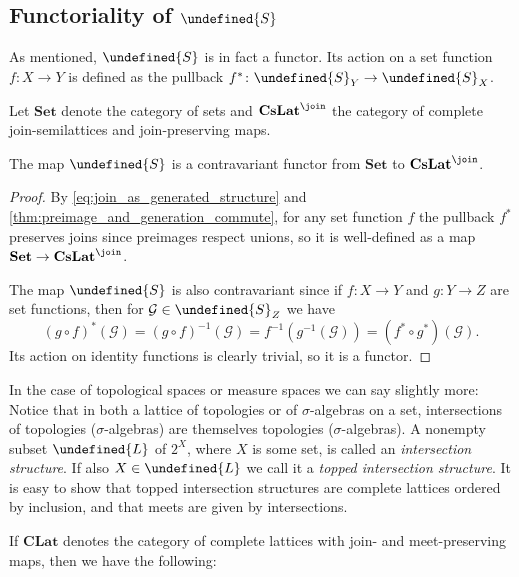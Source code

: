 \documentclass[article, a4paper, 11pt, oneside]{memoir}
\let\mathfrak\undefined
\numberwithin{equation}{chapter}
\newcommand{\calG}{\mathcal{G}}
\newcommand{\strucS}{\mathfrak{S}}
\newcommand{\frakL}{\mathfrak{L}}
\newcommand{\ncat}[1]{\mathbf{#1}} %
\newcommand{\catSet}{\ncat{Set}} %
\newcommand{\catCLat}{\ncat{CLat}} %
\newcommand{\catCJoinLat}{\ncat{CsLat}^{\join}} %
\newcommand{\preim}{^{-1}}
\begin{document}
\subsection{Functoriality of $\strucS$}

As mentioned, $\strucS$ is in fact a functor. Its action on a set function $f \colon X \to Y$ is defined as the pullback $f^* \colon \strucS_Y \to \strucS_X$. 

Let $\catSet$ denote the category of sets and $\catCJoinLat$ the category of complete join-semilattices and join-preserving maps.

\begin{proposition}[Functoriality of $\strucS$, I]
    The map $\strucS$ is a contravariant functor from $\catSet$ to $\catCJoinLat$.
\end{proposition}

\begin{proof}
    By \eqref{eq:join_as_generated_structure} and \cref{thm:preimage_and_generation_commute}, for any set function $f$ the pullback $f^*$ preserves joins since preimages respect unions, so it is well-defined as a map $\catSet \to \catCJoinLat$.
    
    The map $\strucS$ is also contravariant since if $f \colon X \to Y$ and $g \colon Y \to Z$ are set functions, then for $\calG \in \strucS_Z$ we have
    \begin{equation*}
        (g \circ f)^*(\calG)
            = (g \circ f)\preim(\calG)
            = f\preim(g\preim(\calG))
            = (f^* \circ g^*) (\calG).
    \end{equation*}
    Its action on identity functions is clearly trivial, so it is a functor.
\end{proof}

In the case of topological spaces or measure spaces we can say slightly more: Notice that in both a lattice of topologies or of $\sigma$-algebras on a set, intersections of topologies ($\sigma$-algebras) are themselves topologies ($\sigma$-algebras). A nonempty subset $\frakL$ of $2^X$, where $X$ is some set, is called an \emph{intersection structure}. If also $X \in \frakL$ we call it a \emph{topped intersection structure}. It is easy to show that topped intersection structures are complete lattices ordered by inclusion, and that meets are given by intersections.

If $\catCLat$ denotes the category of complete lattices with join- and meet-preserving maps, then we have the following:
\end{document}

